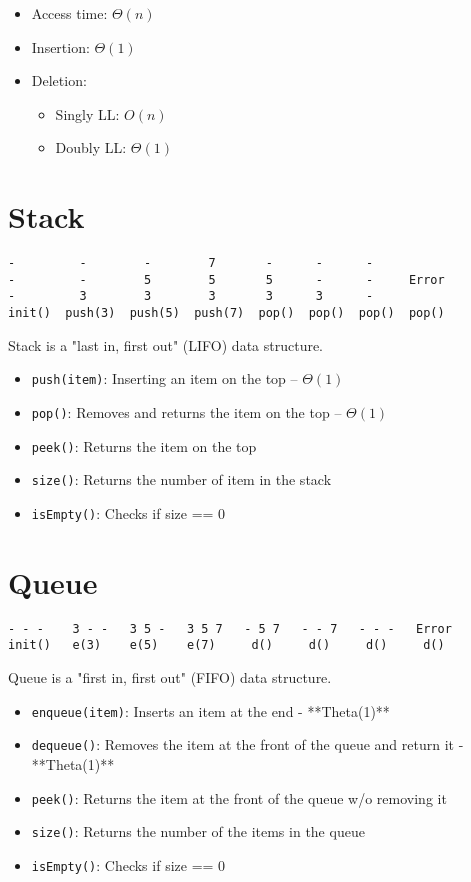 \begin{itemize}
  \item Access time: $\Theta (n)$
  \item Insertion: $\Theta(1)$
  \item Deletion:
    \begin{itemize}
      \item Singly LL: $O(n)$
      \item Doubly LL: $\Theta (1)$
    \end{itemize}
\end{itemize}

\section{Stack}

\begin{verbatim}
-         -        -        7       -      -      -
-         -        5        5       5      -      -     Error
-         3        3        3       3      3      -
init()  push(3)  push(5)  push(7)  pop()  pop()  pop()  pop()
\end{verbatim}

\noindent Stack is a "last in, first out" (LIFO) data structure.

\begin{itemize}
  \item \texttt{push(item)}: Inserting an item on the top -- $\Theta (1)$
  \item \texttt{pop()}: Removes and returns the item on the top -- $\Theta (1)$
  \item \texttt{peek()}: Returns the item on the top
  \item \texttt{size()}: Returns the number of item in the stack
  \item \texttt{isEmpty()}: Checks if size == 0
\end{itemize}

\section{Queue}

\begin{verbatim}
- - -    3 - -   3 5 -   3 5 7   - 5 7   - - 7   - - -   Error
init()   e(3)    e(5)    e(7)     d()     d()     d()     d()
\end{verbatim}

\noindent Queue is a "first in, first out" (FIFO) data structure.

\begin{itemize}
  \item \texttt{enqueue(item)}: Inserts an item at the end - **Theta(1)**
  \item \texttt{dequeue()}: Removes the item at the front of the queue and return it - **Theta(1)**
  \item \texttt{peek()}: Returns the item at the front of the queue w/o removing it
  \item \texttt{size()}: Returns the number of the items in the queue
  \item \texttt{isEmpty()}: Checks if size == 0
\end{itemize}

